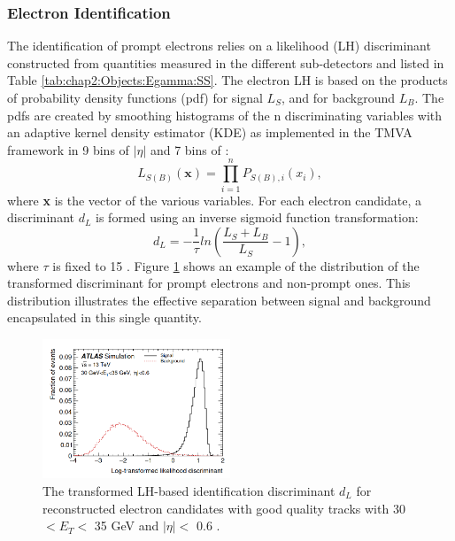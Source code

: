 \subsubsection{Electron Identification}
\label{chap2:Objects:Egamma:EID}
The identification of prompt electrons relies on a likelihood (LH) discriminant constructed from quantities measured in the different sub-detectors and listed in Table \ref{tab:chap2:Objects:Egamma:SS}. The electron LH is based on the products of probability density functions (pdf) for signal $L_S$, and for background $L_B$. The pdfs are created by smoothing histograms of the n discriminating variables with an adaptive kernel density estimator (KDE) \cite{KDE} as implemented in the TMVA framework \cite{TMVA} in 9 bins of $|\eta|$ and 7 bins of \eT:
\begin{equation}
    L_{S(B)}(\textbf{x}) = \displaystyle\prod_{i=1}^{n} P_{S(B),i}(x_i),
\end{equation}
where \textbf{x} is the vector of the various variables. For each electron candidate, a discriminant $d_L$ is formed using an inverse sigmoid function transformation:
\begin{equation}
    d_L = -\frac{1}{\tau}ln(\frac{L_S+L_B}{L_S} - 1),
\end{equation}
where $\tau$ is fixed to 15 \cite{TMVA}. Figure \ref{fig:chap2:Objects:Egamma:EID:LH} shows an example of the distribution of the transformed discriminant for prompt electrons and non-prompt ones. This distribution illustrates the effective separation between signal and background encapsulated in this single quantity.
\begin{figure}[htbp]
    \centering
    \includegraphics[width=0.5\textwidth]{Ch2/Img/Electron_LH.png}
    \caption{The transformed LH-based identification discriminant $d_L$ for reconstructed electron candidates with good quality tracks with 30 $ < E_T < $ 35 GeV and $|\eta|<$ 0.6 \cite{Electron_ID_2016}.}
    \label{fig:chap2:Objects:Egamma:EID:LH}
\end{figure}
\\
